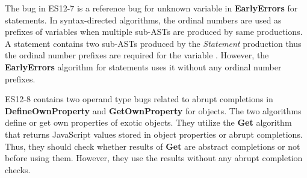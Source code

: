 The bug in ES12-7 is a reference bug for unknown variable  in
\textbf{EarlyErrors} for  statements.  In syntax-directed algorithms,
the ordinal numbers are used as prefixes of variables when multiple sub-ASTs are
produced by same productions.  A  statement contains two sub-ASTs
produced by the \textit{Statement} production thus the ordinal number prefixes
are required for the variable .  However, the
\textbf{EarlyErrors} algorithm for  statements uses it without any
ordinal number prefixes.

ES12-8 contains two operand type bugs related to abrupt completions in
\textbf{DefineOwnProperty} and \textbf{GetOwnProperty} for 
objects.  The two algorithms define or get own properties of 
exotic objects.  They utilize the \textbf{Get} algorithm that returns JavaScript
values stored in object properties or abrupt completions.  Thus, they should
check whether results of \textbf{Get} are abstract completions or not before
using them.  However, they use the results without any abrupt completion checks.
